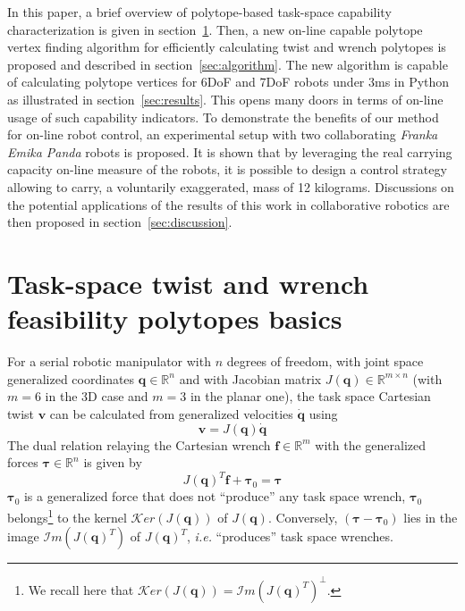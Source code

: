 In this paper, a brief overview of polytope-based task-space capability characterization is given in section~\ref{sec:section_rappel}. Then, a new on-line capable polytope vertex finding algorithm for efficiently calculating twist and wrench polytopes is proposed and described in section~\ref{sec:algorithm}. The new algorithm is capable of calculating polytope vertices for 6DoF and 7DoF robots under 3ms in Python as illustrated in section~\ref{sec:results}. This opens many doors in terms of on-line usage of such capability indicators. To demonstrate the benefits of our method for on-line robot control, an experimental setup with two collaborating \textit{Franka Emika Panda} robots is proposed. It is shown that by leveraging the real carrying capacity on-line measure of the robots, it is possible to design a control strategy allowing to carry, a voluntarily exaggerated, mass of 12 kilograms.  Discussions on the potential applications of the results of this work in collaborative robotics are then proposed in section~\ref{sec:discussion}.


\section{Task-space twist and wrench feasibility polytopes basics}
\label{sec:section_rappel}
For a serial robotic manipulator with $n$ degrees of freedom, with joint space generalized coordinates $\bm{q} \in \mathbb{R}^{n}$ and with Jacobian matrix $J(\bm{q})\in \mathbb{R}^{m \times n}$ (with $m=6$ in the 3D case and $m=3$ in the planar one), the task space Cartesian twist  $\bm{v}$ can be calculated from generalized velocities $\bm{\dot{q}}$ using
\begin{equation}
    \bm{v} = J(\bm{q})\bm{\dot{q}}
    \label{eq:velocity}
\end{equation}
The dual relation relaying the Cartesian wrench $\bm{f} \in \mathbb{R}^m$ with the generalized forces $\bm{\tau} \in \mathbb{R}^n$ is given by
\begin{equation}
    J(\bm{q})^T \bm{f} + \bm{\tau}_0 = \bm{\tau}
    \label{eq:force}
\end{equation}
$\bm{\tau}_0$ is a generalized force that does not ``produce'' any task space wrench,  $\bm{\tau}_0$ belongs\footnote{We recall here that $\mathcal{K}er(J(\bm{q})) = \mathcal{I}m(J(\bm{q})^T)^\bot$.} to the kernel $\mathcal{K}er(J(\bm{q}))$ of $J(\bm{q})$. Conversely, $(\bm{\tau}-\bm{\tau}_0)$ lies in the image  $\mathcal{I}m(J(\bm{q})^T)$ of  $J(\bm{q})^T$, \textit{i.e.} ``produces'' task space wrenches.

